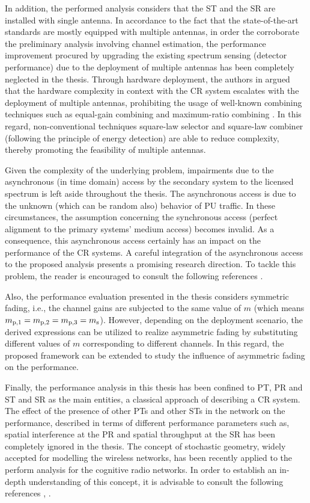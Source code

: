 In addition, the performed analysis considers that the ST and the SR are installed with single antenna. In accordance to the fact that the state-of-the-art standards are mostly equipped with multiple antennas, in order the corroborate the preliminary analysis involving channel estimation, the performance improvement procured by upgrading the existing spectrum sensing (detector performance) due to the deployment of multiple antennas \cite{Dig07,Tah10} has been completely neglected in the thesis. Through hardware deployment, the authors in  argued that the hardware complexity in context with the CR system escalates with the deployment of multiple antennas, prohibiting the usage of well-known combining techniques such as equal-gain combining and maximum-ratio combining \cite{Alouini03}. In this regard, non-conventional techniques square-law selector and square-law combiner (following the principle of energy detection) are able to reduce complexity, thereby promoting the feasibility of multiple antennas. 

Given the complexity of the underlying problem, impairments due to the asynchronous (in time domain) access by the secondary system to the licensed spectrum is left aside throughout the thesis. The asynchronous access is due to the unknown (which can be random also) behavior of PU traffic. In these circumstances, the assumption concerning the synchronous access (perfect alignment to the primary systems' medium access) becomes invalid. As a consequence, this asynchronous access certainly has an impact on the performance of the CR systems. A careful integration of the asynchronous access to the proposed analysis presents a promising research direction. To tackle this problem, the reader is encouraged to consult the following references \cite{Jiang13_, Jiang15}.

Also, the performance evaluation presented in the thesis considers symmetric fading, i.e., the channel gains are subjected to the same value of $m$ (which means $m_{\text{p,1}} = m_{\text{p,2}} = m_{\text{p,3}} = m_{\text{s}}$). However, depending on the deployment scenario, the derived expressions can be utilized to realize asymmetric fading by substituting different values of $m$ corresponding to different channels. In this regard, the proposed framework can be extended to study the influence of asymmetric fading on the performance. 

Finally, the performance analysis in this thesis has been confined to PT, PR and ST and SR as the main entities, a classical approach of describing a CR system. The effect of the presence of other PTs and other STs in the network on the performance, described in terms of different performance parameters such as, spatial interference at the PR and spatial throughput at the SR has been completely ignored in the thesis. The concept of stochastic geometry, widely accepted for modelling the wireless networks, has been recently applied to the perform analysis for the cognitive radio networks. In order to establish an in-depth understanding of this concept, it is advisable to consult the following references \cite{Ghasemi08, Lee12, Kusal12, Kusal13, Elsawy13, Song14}, . 


